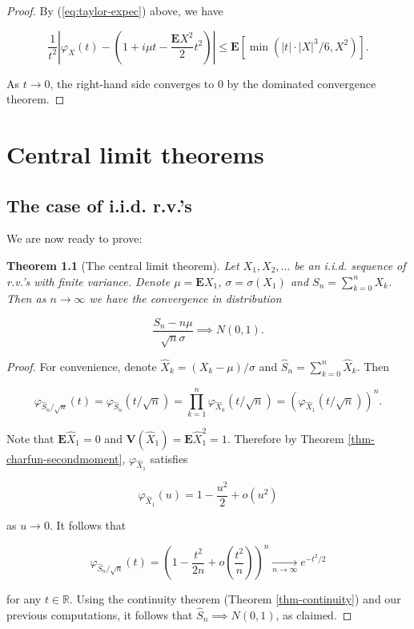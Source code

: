 \documentclass[11pt]{report}
\newcommand{\R}{\mathbb{R}}
\theoremstyle{plain}
\newtheorem{thm}{Theorem}[chapter]
\theoremstyle{definition}
\begin{document}
\begin{proof}
By (\ref{eq:taylor-expec}) above, we have

\[
\frac{1}{t^2}\left|\varphi_X(t) - \left(1 + i \mu t - \frac{\mathbf{E} X^2}{2} t^2\right)\right| \le \mathbf{E} \left[ \min\left(|t| \cdot |X|^3/6,
X^2 \right) \right].
\]

As $t\to 0$, the right-hand side converges to 0 by
the dominated convergence theorem.
\end{proof}

\chapter{Central limit theorems}

\section{The case of i.i.d. r.v.’s}
We are now ready to prove:

\begin{thm}[The central limit theorem]
Let $X_1, X_2, \ldots$ be an i.i.d. sequence of
r.v.'s with finite variance. Denote
$\mu = \mathbf{E} X_1$, $\sigma = \sigma(X_1)$ and
$S_n = \sum_{k=0}^n X_k$. Then as $n\to\infty$ we
have the convergence in distribution

\[
\frac{S_n-n\mu}{\sqrt{n}\sigma} \implies N(0,1).
\]

\end{thm}

\begin{proof}
For convenience, denote
$\hat{X}_k = (X_k - \mu)/\sigma$ and
$\hat{S}_n = \sum_{k=0}^n \hat{X}_k$. Then

\[
\varphi_{\hat{S}_n/\sqrt{n}}(t) = \varphi_{\hat{S}_n}(t/\sqrt{n})
= \prod_{k=1}^n \varphi_{\hat{X}_k}(t/\sqrt{n}) = \left(\varphi_{\hat{X}_1}(t/\sqrt{n})\right)^n.
\]

Note that $\mathbf{E} \hat{X}_1 = 0$ and
$\mathbf{V}(\hat{X}_1)=\mathbf{E} \hat{X}_1^2 = 1$.
Therefore by Theorem \ref{thm-charfun-secondmoment},
$\varphi_{\hat{X}_1}$ satisfies

\[
\varphi_{\hat{X}_1}(u) = 1 - \frac{u^2}{2} + o(u^2)
\]

as $u\to0$. It follows that

\[
\varphi_{\hat{S}_n/\sqrt{n}}(t) = \left(1 - \frac{t^2}{2n} + o\left(\frac{t^2}{n}\right) \right)^n \xrightarrow[n\to\infty]{} e^{-t^2/2}
\]

for any $t\in\R$. Using the continuity theorem
(Theorem \ref{thm-continuity}) and our previous
computations, it follows that
$\hat{S}_n \implies N(0,1)$, as claimed.
\end{proof}
\end{document}
